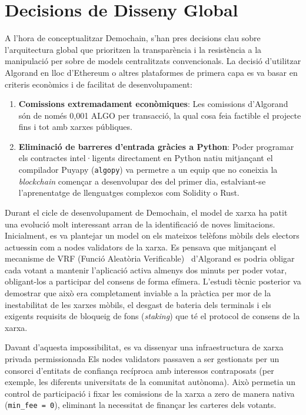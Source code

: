 \section{Decisions de Disseny Global}
\label{sec:decisions-disseny-global}

A l'hora de conceptualitzar Demochain, s'han pres decisions clau sobre l'arquitectura global que prioritzen la
transparència i la resistència a la manipulació per sobre de models centralitzats convencionals.
La decisió d'utilitzar Algorand en lloc d'Ethereum o altres plataformes de primera capa es va basar en criteris
econòmics i de facilitat de desenvolupament:

\begin{enumerate}
    \item \textbf{Comissions extremadament econòmiques}: Les comissions d'Algorand són de només 0,001 ALGO per
    transacció, la qual cosa feia factible el projecte fins i tot amb xarxes públiques.

    \item \textbf{Eliminació de barreres d'entrada gràcies a Python}: Poder programar els contractes intel·ligents
    directament en Python natiu mitjançant el compilador Puyapy (\texttt{algopy}) va permetre a un equip que no coneixia
    la \textit{blockchain} començar a desenvolupar des del primer dia, estalviant-se l'aprenentatge de llenguatges
    complexos com Solidity o Rust.
\end{enumerate}

Durant el cicle de desenvolupament de Demochain, el model de xarxa ha patit una evolució molt interessant arran de la
identificació de noves limitacions.
Inicialment, es va plantejar un model on els mateixos telèfons mòbils dels electors actuessin com a nodes validators de
la xarxa.
Es pensava que mitjançant el mecanisme de VRF (Funció Aleatòria Verificable)~\cite{micali1999vrf} d'Algorand es podria obligar cada votant a
mantenir l'aplicació activa almenys dos minuts per poder votar, obligant-los a participar del consens de forma efímera.
L'estudi tècnic posterior va demostrar que això era completament inviable a la pràctica per mor de la inestabilitat de
les xarxes mòbils, el desgast de bateria dels terminals i els exigents requisits de bloqueig de fons (\textit{staking})
que té el protocol de consens de la xarxa.

Davant d'aquesta impossibilitat, es va dissenyar una infraestructura de xarxa privada permissionada Els nodes validators
passaven a ser gestionats per un consorci d'entitats de confiança recíproca amb interessos contraposats (per exemple,
les diferents universitats de la comunitat autònoma).
Això permetia un control de participació i fixar les comissions de la xarxa a zero de manera nativa (\texttt{min\_fee =
0}), eliminant la necessitat de finançar les carteres dels votants.

